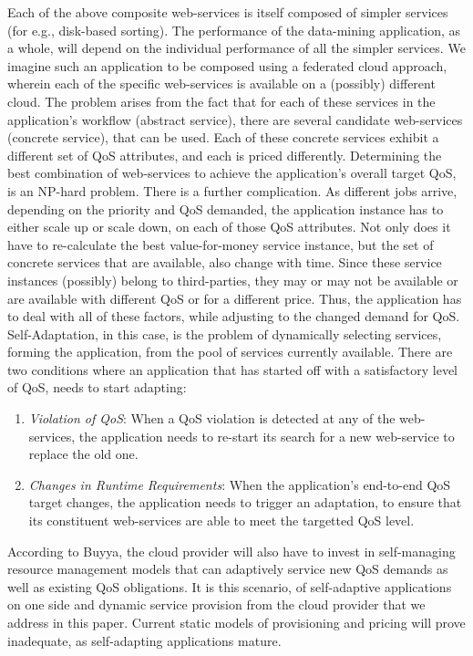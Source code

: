 \documentclass[10pt,journal,compsoc]{IEEEtran}
\begin{document}
Each of the above composite web-services is itself composed of simpler services (for e.g., disk-based sorting). The performance of the data-mining application, as a whole, will depend on the individual performance of all the simpler services. We imagine such an application to be composed using a federated cloud approach, wherein each of the specific web-services is available on a (possibly) different cloud. The problem arises from the fact that for each of these services in the application's workflow (abstract service), there are several candidate web-services (concrete service), that can be used. Each of these concrete services exhibit a different set of QoS attributes, and each is priced differently. Determining the best combination of web-services to achieve the application's overall target QoS, is an NP-hard problem\cite{Ardagna2005Global}. There is a further complication. As different jobs arrive, depending on the priority and QoS demanded, the application instance has to either scale up or scale down, on each of those QoS attributes. Not only does it have to re-calculate the best value-for-money service instance, but the set of concrete services that are available, also change with time. Since these service instances (possibly) belong to third-parties, they may or may not be available or are available with different QoS or for a different price. Thus, the application has to deal with all of these factors, while adjusting to the changed demand for QoS.  Self-Adaptation, in this case, is the problem of dynamically selecting services, forming the application, from the pool of services currently available. There are two conditions where an application that has started off with a satisfactory level of QoS, needs to start adapting:
	\begin{enumerate}
	    \item \textit{Violation of QoS}: When a QoS violation is detected at any of the web-services, the application needs to re-start its search for a new web-service to replace the old one.
	     \item \textit{Changes in Runtime Requirements}: When the application's end-to-end QoS target changes, the application needs to trigger an adaptation, to ensure that its constituent web-services are able to meet the targetted QoS level.
	\end{enumerate} 
According to Buyya, the cloud provider will also have to invest in self-managing resource management models that can adaptively service new QoS demands as well as existing QoS obligations\cite{Buyya2008Market-Oriented}. It is this scenario, of self-adaptive applications on one side and dynamic service provision from the cloud provider that we address in this paper. Current static models of provisioning and pricing will prove inadequate, as self-adapting applications mature.
  
\end{document}
